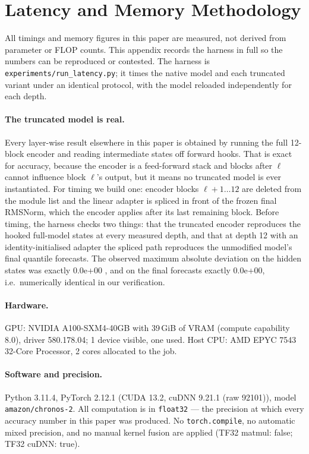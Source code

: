 \section{Latency and Memory Methodology}
\label{app:latency-methodology}

All timings and memory figures in this paper are measured, not derived from parameter or
FLOP counts. This appendix records the harness in full so the numbers can be reproduced or
contested. The harness is \texttt{experiments/run\_latency.py}; it times the native model
and each truncated variant under an identical protocol, with the model reloaded
independently for each depth.

\paragraph{The truncated model is real.}
Every layer-wise result elsewhere in this paper is obtained by running the full 12-block
encoder and reading intermediate states off forward hooks. That is exact for accuracy,
because the encoder is a feed-forward stack and blocks after $\ell$ cannot influence block
$\ell$'s output, but it means no truncated model is ever instantiated. For timing we build
one: encoder blocks $\ell+1 \ldots 12$ are deleted from the module list and the linear
adapter is spliced in front of the frozen final RMSNorm, which the encoder applies after
its last remaining block. Before timing, the harness checks two things: that the
truncated encoder reproduces the hooked full-model states at every measured depth, and
that at depth 12 with an identity-initialised adapter the spliced path reproduces the
unmodified model's final quantile forecasts. The observed maximum absolute deviation on
the hidden states was exactly 0.0e+00
, and on the final forecasts exactly 0.0e+00, i.e.\ numerically identical in our verification.

\paragraph{Hardware.}
GPU: NVIDIA A100-SXM4-40GB with 39\,GiB of VRAM (compute capability 8.0), driver 580.178.04; 1 device visible, one used. Host CPU: AMD EPYC 7543 32-Core Processor, 2 cores allocated to the job.

\paragraph{Software and precision.}
Python 3.11.4, PyTorch 2.12.1 (CUDA 13.2, cuDNN 9.21.1 (raw 92101)), model \texttt{amazon/chronos-2}. 
All computation is in \texttt{float32} --- the precision at which every accuracy number
in this paper was produced. No \texttt{torch.compile}, no automatic mixed precision, and no
manual kernel fusion are applied (TF32 matmul: false; TF32 cuDNN: true).

